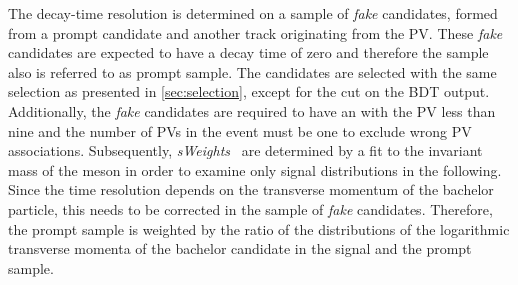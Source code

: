 The decay-time resolution is determined on a sample of \emph{fake} \Bz candidates, formed from a prompt \Dpm candidate and another track originating from the PV.
These \emph{fake} \mbox{\Bz candidates} are expected to have a decay time of zero and therefore the sample also is referred to as prompt sample.
The candidates are selected with the same selection as presented in \cref{sec:selection}, except for the cut on the BDT output.
Additionally, the \emph{fake} \mbox{\Bz candidates} are required to have an \chisqip with the PV less than nine and the number of \ac{PV}s in the event must be one to exclude wrong \ac{PV} associations.
Subsequently, \emph{sWeights}~\cite{Pivk:2004ty} are determined by a fit to the invariant mass of the \Dpm meson in order to examine only signal distributions in the following.
Since the time resolution depends on the transverse momentum of the bachelor particle, this needs to be corrected in the sample of \emph{fake} \mbox{\Bz candidates}.
Therefore, the prompt sample is weighted by the ratio of the distributions of the logarithmic transverse momenta of the bachelor candidate in the signal \BdToDpi and the prompt sample.

